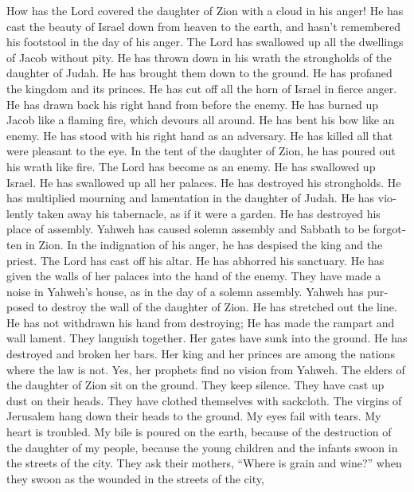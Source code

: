 \begin{paracol}{2}
\begin{otherlanguage}{english}
 How has the Lord covered the daughter of Zion with a
cloud in his anger! He has cast the beauty of Israel down from heaven to
the earth, and hasn't remembered his footstool in the day of his anger.
 The Lord has swallowed up all the dwellings of Jacob
without pity. He has thrown down in his wrath the strongholds of the
daughter of Judah. He has brought them down to the ground. He has
profaned the kingdom and its princes.  He has cut off all
the horn of Israel in fierce anger. He has drawn back his right hand
from before the enemy. He has burned up Jacob like a flaming fire, which
devours all around.  He has bent his bow like an enemy. He
has stood with his right hand as an adversary. He has killed all that
were pleasant to the eye. In the tent of the daughter of Zion, he has
poured out his wrath like fire.  The Lord has become as an
enemy. He has swallowed up Israel. He has swallowed up all her palaces.
He has destroyed his strongholds. He has multiplied mourning and
lamentation in the daughter of Judah.  He has violently
taken away his tabernacle, as if it were a garden. He has destroyed his
place of assembly. Yahweh has caused solemn assembly and Sabbath to be
forgotten in Zion. In the indignation of his anger, he has despised the
king and the priest.  The Lord has cast off his altar. He
has abhorred his sanctuary. He has given the walls of her palaces into
the hand of the enemy. They have made a noise in Yahweh's house, as in
the day of a solemn assembly.  Yahweh has purposed to
destroy the wall of the daughter of Zion. He has stretched out the line.
He has not withdrawn his hand from destroying; He has made the rampart
and wall lament. They languish together.  Her gates have
sunk into the ground. He has destroyed and broken her bars. Her king and
her princes are among the nations where the law is not. Yes, her
prophets find no vision from Yahweh.  The elders of the
daughter of Zion sit on the ground. They keep silence. They have cast up
dust on their heads. They have clothed themselves with sackcloth. The
virgins of Jerusalem hang down their heads to the ground.
 My eyes fail with tears. My heart is troubled. My bile
is poured on the earth, because of the destruction of the daughter of my
people, because the young children and the infants swoon in the streets
of the city.  They ask their mothers, ``Where is grain
and wine?'' when they swoon as the wounded in the streets of the city,

\end{otherlanguage}
\end{paracol}
